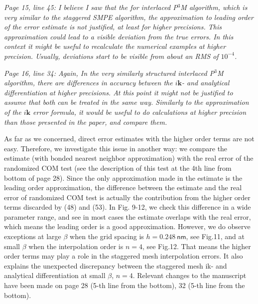 \documentclass[a4paper]{article}
\begin{document}
\textit{ Page 15, line 45: I believe I saw that the for interlaced
  P$^3$M algorithm, which is very similar to the staggered SMPE
  algorithm, the approximation to leading order of the error estimate
  is not justified, at least for higher precisions. This approximation
  could lead to a visible deviation from the true errors. In this
  context it might be useful to recalculate the numerical examples at
  higher precision. Usually, deviations start to be visible from about
  an RMS of $10^{-4}$.  }

\textit{ Page 16, line 34: Again, In the very similarly structured
  interlaced P$^3$M algorithm, there are differences in accuracy
  between the $i\mathbf{k}$- and analytical differentiation at higher
  precisions. At this point it might not be justified to assume that
  both can be treated in the same way. Similarly to the approximation
  of the $i\mathbf{k}$ error formula, it would be useful to do
  calculations at higher precision than those presented in the paper,
  and compare them. }

As far as we concerned,
direct error estimates with the higher order terms are not easy.
Therefore, we investigate this issue in another way:
we compare the estimate (with bonded nearest neighbor
approximation) with the real error of the randomized COM test
(see the description of this test at the 4th line from bottom of page 28).
Since the only approximation made in the estimate is the leading order
approximation, the difference between the estimate and the real error
of randomized COM test is actually the contribution from the higher
order terms discarded by (48) and (53).
In Fig. 9-12,
we check this difference in a wide parameter range, and see in most
cases the estimate overlaps with the real error, which means
the leading order is a good approximation. 
However,
we do observe exceptions
at large $\beta$ when the grid spacing is $h=0.248\:\textsf{nm}$,
see Fig.11, and
at small $\beta$ when the interpolation order is $n=4$,
see Fig.12.
That means the higher order terms may play a role in the staggered
mesh interpolation errors. It also explains the unexpected discrepancy
between the staggered mesh ik- and analytical differentiation
at small $\beta$, $n=4$.
Relevant changes to the manuscript
have been made on page 28 (5-th line from the bottom), 32 (5-th line from the bottom).
\\


\end{document}
